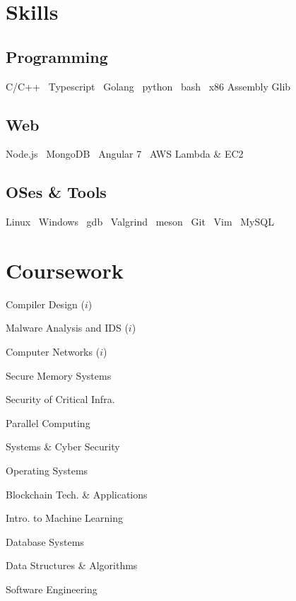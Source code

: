 \documentclass[a4paper]{deedy-resume-reversed}
\begin{document}
\begin{minipage}[t]{0.33\textwidth}

\section{Skills}
\subsection{Programming}
    C/C++  \textbullet\ Typescript  \textbullet\ Golang \textbullet\
    python \textbullet\ bash  \textbullet\ x86 Assembly \textbullet{} Glib
\sectionsep

\subsection{Web}
    Node.js \textbullet\ MongoDB \textbullet\ Angular 7 \textbullet\ AWS Lambda \& EC2
\sectionsep

    \subsection{OSes \& Tools}
    Linux \textbullet\ Windows \textbullet\ gdb \textbullet\ Valgrind \textbullet\ meson \textbullet\  Git \textbullet\ Vim \textbullet\ MySQL
\sectionsep


\section{Coursework}
\vspace{10pt} %
\begin{tightemize}
\item Compiler Design ($i$)
\item Malware Analysis and IDS ($i$)
\item Computer Networks ($i$)
\item Secure Memory Systems
\item Security of Critical Infra.
\item Parallel Computing
\item Systems \& Cyber Security
\item Operating Systems
\item Blockchain Tech. \& Applications
\item Intro. to Machine Learning
\item Database Systems
\item Data Structures \& Algorithms
\item Software Engineering
\end{tightemize}
\sectionsep


\end{minipage}
\end{document}
